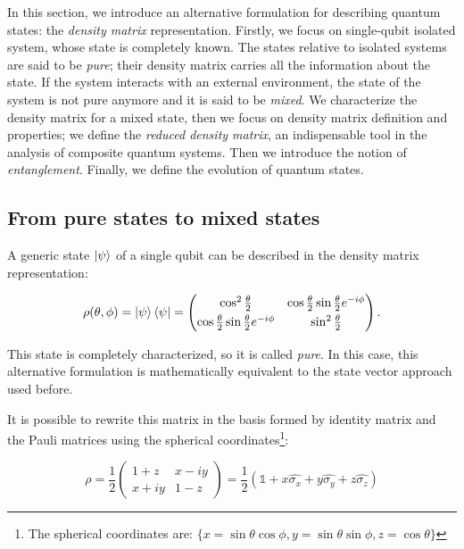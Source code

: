 In this section, we introduce an alternative formulation for describing quantum states: the \textit{density matrix} representation. Firstly, we focus on single-qubit isolated system, whose state is completely known. 
The states relative to isolated systems are said to be \textit{pure}; their density matrix carries all the information about the state. If the system interacts with an external environment, the state of the system is not pure anymore and it is said to be \textit{mixed}. We characterize the density matrix for a mixed state, then we focus on density matrix definition and properties; we define the \textit{reduced density matrix}, an indispensable tool in the analysis of composite quantum systems. Then we introduce the notion of \textit{entanglement}. Finally, we define the evolution of quantum states. 


\subsection{From pure states to mixed states}
A generic state $\left| \psi \right \rangle$ of a single qubit can be described in the density matrix representation:

\begin{equation}
\rho(\theta,\phi)= \ket{\psi}\bra{\psi}= 
\begin{pmatrix}
\cos^2{\frac{\theta}{2}}  &  \cos{\frac{\theta}{2}}\sin{\frac{\theta}{2}}e^{-i\phi} \vspace{0.1cm} \\ 
\cos{\frac{\theta}{2}}\sin{\frac{\theta}{2}}e^{-i\phi}   & \sin^2{\frac{\theta}{2}} 
\end{pmatrix} .
\label{7_firstchapter}
\end{equation}

\noindent This state is completely characterized, so it is called \textit{pure}. In this case, this alternative formulation is mathematically equivalent to the state vector approach used before.

It is possible to rewrite this matrix in the basis formed by identity matrix and the Pauli matrices  using the spherical coordinates\footnote{ The spherical coordinates are: $\{x=\sin \theta \cos \phi, y=\sin \theta \sin \phi, z= \cos \theta\}$}:

\begin{equation}
\rho = \frac{1}{2}
\begin{pmatrix}
1+z &  x-iy \\ 
x+iy  & 1-z
\end{pmatrix} = \frac{1}{2} (\mathbb{1} + x \hat{\sigma_x} + y \hat{\sigma_y} + z \hat{\sigma_z} )
\label{7_2_firstchapter}
\end{equation}

